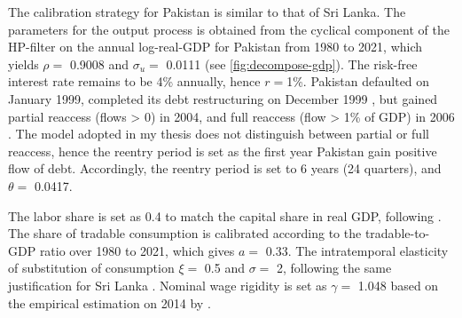 The calibration strategy for Pakistan is similar to that of Sri Lanka.
The parameters for the output process is obtained from the cyclical component of the HP-filter on the annual log-real-GDP for Pakistan from 1980 to 2021, which yields $\rho = $ 0.9008 and $\sigma_u=$ 0.0111 (see \autoref{fig:decompose-gdp}).
The risk-free interest rate remains to be 4\% annually, hence $r= $1\%.
Pakistan defaulted on January 1999, completed its debt restructuring on December 1999 \citep{SPGlobal-default-report}, but gained partial reaccess (flows > 0) in 2004, and full reaccess (flow > 1\% of GDP) in 2006 \citep*[][Table 5.6]{trebesch-2011-sovereign}.
The model adopted in my thesis does not distinguish between partial or full reaccess, hence the reentry period is set as the first year Pakistan gain positive flow of debt. Accordingly, the reentry period is set to 6 years (24 quarters), and $\theta=$ 0.0417.

The labor share is set as 0.4 to match the capital share in real GDP, following \citet{Pakistan-DSGE-calibration}. The share of tradable consumption is calibrated according to the tradable-to-GDP ratio over 1980 to 2021, which gives $a=$ 0.33. The intratemporal elasticity of substitution of consumption $\xi=$ 0.5 and $\sigma=$ 2, following the same justification for Sri Lanka \citep{Pakistan-DSGE-calibration,Uribe-Schmitt-Grohe-textbook}.
Nominal wage rigidity is set as $\gamma=$ 1.048 based on the empirical estimation on 2014 by \citet*{wage-rigidity-data}.

